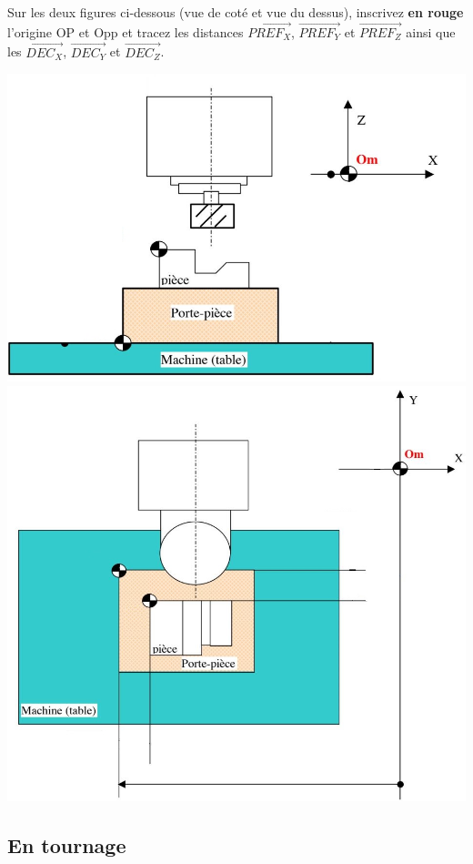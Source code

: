 \documentclass[12pt]{article}
\newcounter{exo}
\newenvironment{exo}{\stepcounter{exo}\vspace{0.5cm}{\bfseries Question \theexo\ :}}{\par\vspace{0.5cm}}
\begin{document}
\begin{exo}\label{exo1} Sur les deux figures ci-dessous (vue de coté et vue du dessus), inscrivez \textbf{en rouge} l'origine OP et Opp et tracez les distances $\overrightarrow{PREF_X}$, $\overrightarrow{PREF_Y}$ et $\overrightarrow{PREF_Z}$ ainsi que les $\overrightarrow{DEC_X}$, $\overrightarrow{DEC_Y}$ et $\overrightarrow{DEC_Z}$.\end{exo}
\begin{center}
\includegraphics[width=0.8\linewidth]{DEC1.JPG}
\includegraphics[width=0.85\linewidth]{DEC2.JPG}
\end{center}

\subsection*{En tournage}
\end{document}
